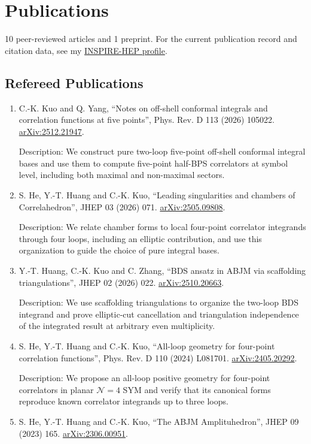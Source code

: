 \documentclass[10pt,a4paper]{article}
\newcommand{\publication}[4]{\item #1, ``#2'', #3. \href{https://arxiv.org/abs/#4}{arXiv:#4}.}
\newcommand{\pubdescription}[1]{{\small\color{muted}Description: #1}}
\begin{document}
\section{Publications}

10 peer-reviewed articles and 1 preprint. For the current publication record and citation data, see my \href{https://inspirehep.net/authors/1945409?ui-citation-summary=true}{INSPIRE-HEP profile}.

\subsection*{Refereed Publications}

\begin{enumerate}
  \publication{C.-K. Kuo and Q. Yang}{Notes on off-shell conformal integrals and correlation functions at five points}{Phys. Rev. D 113 (2026) 105022}{2512.21947}

  \pubdescription{We construct pure two-loop five-point off-shell conformal integral bases and use them to compute five-point half-BPS correlators at symbol level, including both maximal and non-maximal sectors.}

  \publication{S. He, Y.-T. Huang and C.-K. Kuo}{Leading singularities and chambers of Correlahedron}{JHEP 03 (2026) 071}{2505.09808}

  \pubdescription{We relate chamber forms to local four-point correlator integrands through four loops, including an elliptic contribution, and use this organization to guide the choice of pure integral bases.}

  \publication{Y.-T. Huang, C.-K. Kuo and C. Zhang}{BDS ansatz in ABJM via scaffolding triangulations}{JHEP 02 (2026) 022}{2510.20663}

  \pubdescription{We use scaffolding triangulations to organize the two-loop BDS integrand and prove elliptic-cut cancellation and triangulation independence of the integrated result at arbitrary even multiplicity.}

  \publication{S. He, Y.-T. Huang and C.-K. Kuo}{All-loop geometry for four-point correlation functions}{Phys. Rev. D 110 (2024) L081701}{2405.20292}

  \pubdescription{We propose an all-loop positive geometry for four-point correlators in planar $\mathcal{N}=4$ SYM and verify that its canonical forms reproduce known correlator integrands up to three loops.}

  \publication{S. He, Y.-T. Huang and C.-K. Kuo}{The ABJM Amplituhedron}{JHEP 09 (2023) 165}{2306.00951}


\end{enumerate}
\end{document}
